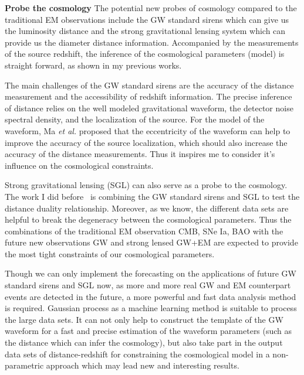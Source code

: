 \documentclass[11pt,letterpaper,sans]{moderncv}   %
\begin{document}
\vspace{2mm}
\noindent
\textcolor{color1}{\textbf{Probe the cosmology}}
The potential new probes of cosmology compared to the traditional EM observations include the GW standard sirens which can give us the luminosity distance and the strong gravitational lensing system which can provide us the diameter distance information. Accompanied by the measurements of the source redshift, the inference of the cosmological parameters (model) is straight forward, as shown in my previous works.

\vspace{2mm}
\noindent
The main challenges of the GW standard sirens are the accuracy of the distance measurement and the accessibility of redshift information. The precise inference of distance relies on the well modeled gravitational waveform, the detector noise spectral density, and the localization of the source. For the model of the waveform, Ma \textit{et al.} proposed that the eccentricity of the waveform can help to improve the accuracy of the source localization, which should also increase the accuracy of the distance measurements. Thus it inspires me to consider it's influence on the cosmological constraints.

\vspace{2mm}
\noindent
Strong gravitational lensing (SGL) can also serve as a probe to the cosmology. The work I did before~\cite{Yang:2017bkv} is combining the GW standard sirens and SGL to test the distance duality relationship. Moreover, as we know, the different data sets are helpful to break the degeneracy between the cosmological parameters. Thus the combinations of the traditional EM observation CMB, SNe Ia, BAO with the future new observations GW and strong lensed GW+EM are expected to provide the most tight constraints of our cosmological parameters. 

\vspace{2mm}
\noindent
Though we can only implement the forecasting on the applications of future GW standard sirens and SGL now, as more and more real GW and EM counterpart events 
are detected in the future, a more powerful and fast data analysis method is required. Gaussian process as a machine learning method is suitable to process the large data sets. It can not only help to construct the template of the GW waveform for a fast and precise estimation of the waveform parameters (such as the distance which can infer the cosmology), but also take part in the output data sets of distance-redshift for constraining the cosmological model in a non-parametric approach which may lead new and interesting results.  
\end{document}
